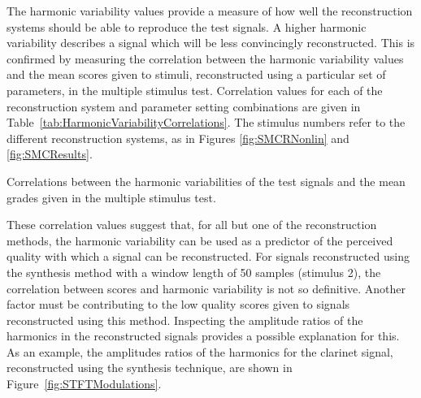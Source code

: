 		The harmonic variability values provide a measure of how well the reconstruction systems should be able to
		reproduce the test signals. A higher harmonic variability describes a signal which will be less
		convincingly reconstructed. This is confirmed by measuring the correlation between the harmonic variability
		values and the mean scores given to stimuli, reconstructed using a particular set of parameters, in the
		multiple stimulus test. Correlation values for each of the reconstruction system and parameter setting
		combinations are given in Table~\ref{tab:HarmonicVariabilityCorrelations}. The stimulus numbers refer to
		the different reconstruction systems, as in Figures \ref{fig:SMCRNonlin} and \ref{fig:SMCResults}.

		\begin{table}[h!]
			\centering
			
			\caption{Correlations between the harmonic variabilities of the test signals and 
				 the mean grades given in the multiple stimulus test.}
			\label{tab:HarmonicVariabilityCorrelations}
		\end{table}

		These correlation values suggest that, for all but one of the reconstruction methods, the harmonic
		variability can be used as a predictor of the perceived quality with which a signal can be reconstructed.
		For signals reconstructed using the synthesis method with a window length of 50 samples (stimulus 2), the
		correlation between scores and harmonic variability is not so definitive. Another factor must be
		contributing to the low quality scores given to signals reconstructed using this method. Inspecting the
		amplitude ratios of the harmonics in the reconstructed signals provides a possible explanation for this.
		As an example, the amplitudes ratios of the harmonics for the clarinet signal, reconstructed using the
		synthesis technique, are shown in Figure~\ref{fig:STFTModulations}.

